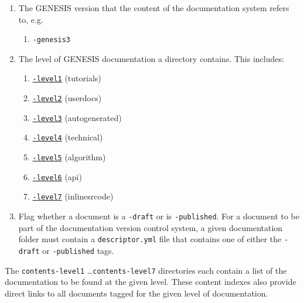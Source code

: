 \documentclass[12pt]{article}
\begin{document}
\begin{enumerate}

\item The GENESIS version that the content of the documentation system refers to, e.g.
\begin{enumerate}
\item  {\tt -genesis3}
\end{enumerate}

\item The level of GENESIS documentation a directory contains. This includes:

	\begin{enumerate}

	\item \href{../contents-level1/contents-level1.pdf}{{\tt -level1}} (tutorials)

	\item \href{../contents-level2/contents-level2.pdf}{{\tt -level2}} (userdocs)

	\item \href{../contents-level3/contents-level3.pdf}{{\tt -level3}} (autogenerated)

	\item \href{../contents-level4/contents-level4.pdf}{{\tt -level4}} (technical)

	\item \href{../contents-level5/contents-level5.pdf}{{\tt -level5}} (algorithm)

	\item \href{../contents-level6/contents-level6.pdf}{{\tt -level6}} (api)

	\item \href{../contents-level7/contents-level7.pdf}{{\tt -level7}} (inlinesrcode)

	\end{enumerate}

\item Flag whether a document is a {\tt -draft} or is {\tt -published}. For a document to be part of the documentation version control system, a given documentation folder must contain a {\tt descriptor.yml} file that contains one of either the {\tt -draft} or {\tt -published} tags.

\end{enumerate}

The {\tt contents-level1} \ldots {\tt contents-level7} directories each contain a list of the documentation to be found at the given level. These content indexes also provide direct links to all documents tagged for the given level of documentation.
\end{document}

